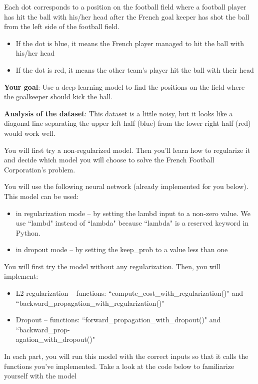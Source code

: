Each dot corresponds to a position on the football field where a football player has hit the ball with his/her head after the French goal keeper has shot the ball from the left side of the football field.
\begin{itemize}
\item If the dot is blue, it means the French player managed to hit the ball with his/her head
\item If the dot is red, it means the other team's player hit the ball with their head
\end{itemize}

{\textbf {Your goal}}: Use a deep learning model to find the positions on the field where the goalkeeper should kick the ball.

{\textbf {Analysis of the dataset}}: This dataset is a little noisy, but it looks like a diagonal line separating the upper left half (blue) from the lower right half (red) would work well.

You will first try a non-regularized model. Then you'll learn how to regularize it and decide which model you will choose to solve the French Football Corporation's problem.



You will use the following neural network (already implemented for you below). This model can be used:
\begin{itemize}
\item in regularization mode -- by setting the lambd input to a non-zero value. We use ``lambd" instead of ``lambda" because ``lambda" is a reserved keyword in Python.
\item in dropout mode -- by setting the keep\_prob to a value less than one
\end{itemize}

You will first try the model without any regularization. Then, you will implement:
\begin{itemize}
\item L2 regularization -- functions: ``compute\_cost\_with\_regularization()" and ``backward\_propagation\_with\_regularization()"
\item Dropout -- functions: ``forward\_propagation\_with\_dropout()" and ``backward\_prop-\\agation\_with\_dropout()"
\end{itemize}

In each part, you will run this model with the correct inputs so that it calls the functions you've implemented. Take a look at the code below to familiarize yourself with the model

